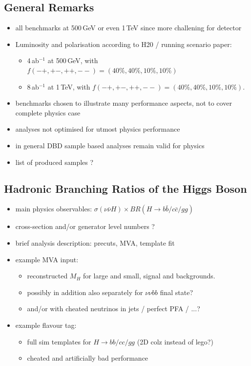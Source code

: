 \subsection{General Remarks}
\begin{itemize}
\item all benchmarks at 500\,GeV or even 1\,TeV since more challening for detector
\item Luminosity and polarisation according to H20 / running scenario paper: 
  \begin{itemize}
   \item 4\,ab$^{-1}$ at 500\,GeV, with $f(-+,+-,++,--) = (40\%,40\%, 10\%, 10\%)$
   \item 8\,ab$^{-1}$ at 1\,TeV, with $f(-+,+-,++,--) = (40\%,40\%, 10\%, 10\%)$.
\end{itemize}
\item benchmarks chosen to illustrate many performance aspects, not to cover complete physics case
\item analyses not optimised for utmost physics performance
\item in general DBD sample based analyses remain valid for physics
\item list of produced samples ?
\end{itemize}

\subsection{Hadronic Branching Ratios of the Higgs Boson}
\begin{itemize}
\item main physics observables: $\sigma(\nu\bar{\nu} H)\times BR(H\to b\bar{b} / c\bar{c} / gg)$
\item cross-section and/or generator level numbers ? 
\item brief analysis description: precuts, MVA, template fit
\item example MVA input: 
  \begin{itemize}
     \item reconstructed $M_H$ for large and small, signal and backgrounds. 
     \item possibly in addition also separately for $\nu\nu bb$ final state?
     \item and/or with cheated neutrinos in jets / perfect PFA / ...?
  \end{itemize}
\item example flavour tag: 
  \begin{itemize}
     \item full sim templates for $H \to bb / cc / gg$ (2D colz instead of lego?)
     \item cheated and artificially bad performance
  \end{itemize}
\end{itemize}

